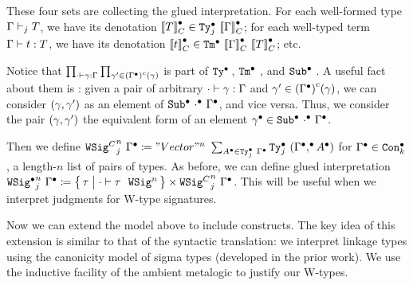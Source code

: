 These four sets are collecting the glued interpretation.
For each well-formed type $\goodType{\Gm}{T}{j}$, we have its denotation $\denotesCC{T} \in \GTy{j}{\denotesCC{\Gm}}$;
for each well-typed term $\goodTerm{\Gm}{t}{T}$, we have its denotation $\denotesCC{t} \in \GTm{\denotesCC{\Gm}}{\denotesCC{T}}$;
etc.


Notice that
$\prod_{\goodSub{\cdot}{\gm}{\Gm}} \prod_{\gm' \in \Gmodel{\Glued{\Gm}}(\gm)}$
is part of $\GTy{\!}{\!}$, $\GTm{\!}{\!}$, and $\GSub{\!}{\!}$.
A useful fact about them is : given a pair of arbitrary $\goodSub{\cdot}{\gm}{\Gm}$
and $\gm' \in \Gmodel{\Glued{\Gm}}(\gm)$, we can consider $(\gm, \gm')$ as an
element of $\GSub{\Glued{\cdot}}{\Glued{\Gm}}$, and vice versa.
Thus, we consider the pair $(\gm,
\gm')$ the equivalent form of an element $\Glued{\gm} \in \GSub{\Glued{\cdot}}{\Glued{\Gm}}$.


Then we define $\GMWSig{j}{\Glued{\Gm}}{n} \coloneq "Vector"^n~\sum_{\Glued{A}
\in \GTy{j}{\Glued{\Gm}}} \GTy{j}{(\GSubstExt{\Glued{\Gm}}{\Glued{A}})}$ for
$\Glued{\Gm} \in \GCon{k}$, a length-$n$ list of pairs of types.
As before, we can define glued interpretation $\GWSig{j}{\Glued{\Gm}}{n}
\coloneq 
\setc{\wsig}{\goodWSig{\cdot}{\wsig}{n}}
\times
\GMWSig{j}{\Glued{\Gm}}{n}$. This will be useful when we interpret judgments for
W-type signatures.


Now we can extend the model above to include \TT constructs.
The key idea of this extension is similar to that of the syntactic translation:
we interpret linkage types using the canonicity model of sigma types (developed in the prior work).
We use the inductive facility of the ambient meta\-logic to justify our W-types.

\newcommand{\CWmodel}{\ensuremath{\mathit{W}^C}}
\newcommand{\CWsup}{\ensuremath{\mathit{W^Csup}}}
\newcommand{\CWrec}{\ensuremath{\mathit{W^Crec}}}

